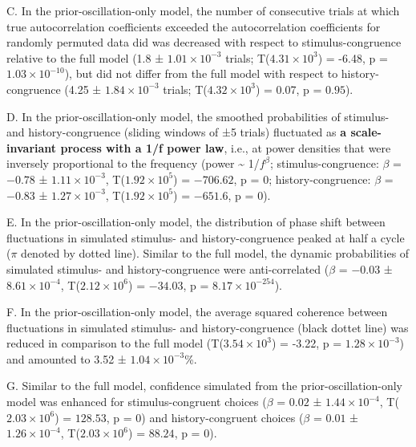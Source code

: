 \documentclass[
]{article}
\begin{document}
C. In the prior-oscillation-only model, the number of consecutive trials
at which true autocorrelation coefficients exceeded the autocorrelation
coefficients for randomly permuted data did was decreased with respect
to stimulus-congruence relative to the full model (1.8 ±
\ensuremath{1.01\times 10^{-3}} trials;
T(\ensuremath{4.31\times 10^{3}}) = -6.48, p =
\(\ensuremath{1.03\times 10^{-10}}\)), but did not differ from the full
model with respect to history-congruence (4.25 ±
\ensuremath{1.84\times 10^{-3}} trials;
T(\ensuremath{4.32\times 10^{3}}) = 0.07, p = \(0.95\)).

D. In the prior-oscillation-only model, the smoothed probabilities of
stimulus- and history-congruence (sliding windows of ±5 trials)
fluctuated as \textbf{a scale-invariant process with a 1/f power law},
i.e., at power densities that were inversely proportional to the
frequency (power \textasciitilde{} 1/\(f^\beta\); stimulus-congruence:
\(\beta\) = \(-0.78\) ± \(\ensuremath{1.11\times 10^{-3}}\),
T(\(\ensuremath{1.92\times 10^{5}}\)) = \(-706.62\), p = \(0\);
history-congruence: \(\beta\) = \(-0.83\) ±
\(\ensuremath{1.27\times 10^{-3}}\),
T(\(\ensuremath{1.92\times 10^{5}}\)) = \(-651.6\), p = \(0\)).

E. In the prior-oscillation-only model, the distribution of phase shift
between fluctuations in simulated stimulus- and history-congruence
peaked at half a cycle (\(\pi\) denoted by dotted line). Similar to the
full model, the dynamic probabilities of simulated stimulus- and
history-congruence were anti-correlated (\(\beta\) = \(-0.03\) ±
\(\ensuremath{8.61\times 10^{-4}}\),
T(\(\ensuremath{2.12\times 10^{6}}\)) = \(-34.03\), p =
\(\ensuremath{8.17\times 10^{-254}}\)).

F. In the prior-oscillation-only model, the average squared coherence
between fluctuations in simulated stimulus- and history-congruence
(black dottet line) was reduced in comparison to the full model
(T(\ensuremath{3.54\times 10^{3}}) = -3.22, p =
\(\ensuremath{1.28\times 10^{-3}}\)) and amounted to 3.52 ±
\ensuremath{1.04\times 10^{-3}}\%.

G. Similar to the full model, confidence simulated from the
prior-oscillation-only model was enhanced for stimulus-congruent choices
(\(\beta\) = \(0.02\) ± \(\ensuremath{1.44\times 10^{-4}}\),
T(\(\ensuremath{2.03\times 10^{6}}\)) = \(128.53\), p = \(0\)) and
history-congruent choices (\(\beta\) = \(0.01\) ±
\(\ensuremath{1.26\times 10^{-4}}\),
T(\(\ensuremath{2.03\times 10^{6}}\)) = \(88.24\), p = \(0\)).
\end{document}
